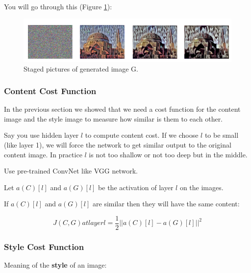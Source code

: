 You will go through this (Figure \ref{stagedG}):
\begin{figure}[!htbp]
    \centering
    \includegraphics[width=1.0\textwidth]{img/c4/stagedG.png}
    \caption{Staged pictures of generated image G.}
    \label{stagedG}  
\end{figure}  

\subsubsection{Content Cost Function}
In the previous section we showed that we need a cost function for the content image and the style image to measure how similar is them to each other.

Say you use hidden layer $l$ to compute content cost. If we choose $l$ to be small (like layer 1), we will force the network to get similar output to the original content image. In practice $l$ is not too shallow or not too deep but in the middle.

Use pre-trained ConvNet like VGG network.

Let $a(C)[l]$ and $a(G)[l]$ be the activation of layer $l$ on the images.

If $a(C)[l]$ and $a(G)[l]$ are similar then they will have the same content:

\begin{equation}
    J(C, G) at layer l = \frac{1}{2} ||a(C)[l] - a(G)[l]||^2
\end{equation}

\subsubsection{Style Cost Function}
Meaning of the \textbf{style} of an image:

